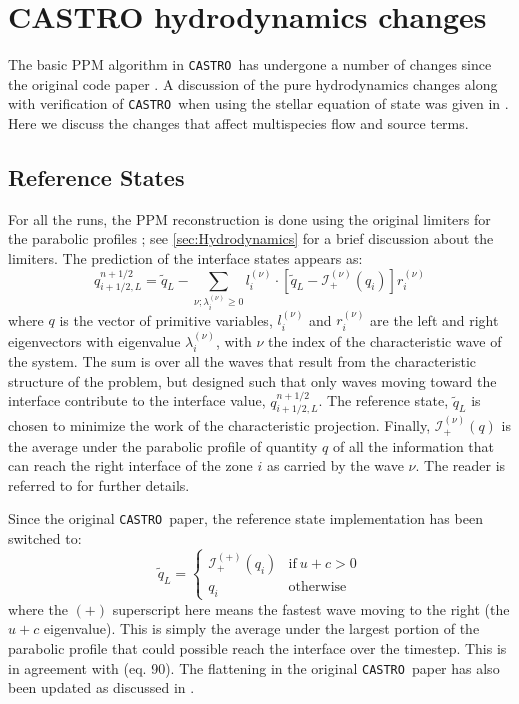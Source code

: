 \documentclass[iop]{../emulateapj}
\newcommand{\castro}{\texttt{CASTRO}}
\begin{document}
\clearpage

\appendix

\section{CASTRO hydrodynamics changes}
\label{app:hydro}

The basic PPM algorithm in \castro\ has undergone a number of changes
since the original code paper \citep{castro}.  A discussion of the
pure hydrodynamics changes along with verification of \castro\ when
using the stellar equation of state was given in
\citet{zingalekatz:2015}.  Here we discuss the changes that affect
multispecies flow and source terms.

\subsection{Reference States}

For all the runs, the PPM reconstruction is done using the original limiters for
the parabolic profiles \citep{ppm}; see \autoref{sec:Hydrodynamics} for a brief 
discussion about the limiters.  The prediction of the interface
states appears as:
\begin{equation}
\label{eq:ppmstatel}
q_{i+1/2,L}^{n+1/2} = \tilde{q}_L -
   \sum_{\nu;\lambda_i^{(\nu)}\ge 0} l_i^{(\nu)} \cdot \left [
        \tilde{q}_L  - \mathcal{I}^{(\nu)}_+(q_i)
       \right ] r_i^{(\nu)}
\end{equation}
where $q$ is the vector of primitive variables, $l_i^{(\nu)}$ and
$r_i^{(\nu)}$ are the left and right eigenvectors with eigenvalue
$\lambda_i^{(\nu)}$, with $\nu$ the index of the characteristic wave of
the system.  The sum is over all the waves that result from the
characteristic structure of the problem, but designed such that only
waves moving toward the interface contribute to the interface value,
$q_{i+1/2,L}^{n+1/2}$.  The reference state, $\tilde{q}_L$ is
chosen to minimize the work of the characteristic projection.
Finally, $\mathcal{I}_+^{(\nu)}(q)$ is the
average under the parabolic profile of quantity $q$ of all the
information that can reach the right interface of the zone $i$ as
carried by the wave $\nu$.  The reader is referred to
\citet{ppmunsplit} for further details.

Since the original \castro\ paper, the reference state implementation
has been switched to:
\begin{equation}
\label{eq:refchoice}
\tilde{q}_L = \left \{ \begin{array}{cc}
       \mathcal{I}_+^{(+)}(q_i) & \mathrm{if~} u + c > 0 \\
       q_i                    & \mathrm{otherwise}
\end{array}
\right .
\end{equation}
where the $(+)$ superscript here means the fastest wave moving to the right
(the $u+c$ eigenvalue).   This is simply the average under the largest
portion of the parabolic profile that could possible reach the interface 
over the timestep.  This is
in agreement with \citet{ppmunsplit} (eq. 90).  The flattening
in the original \castro\ paper has also been updated as discussed
in \citet{zingalekatz:2015}.
\end{document}
